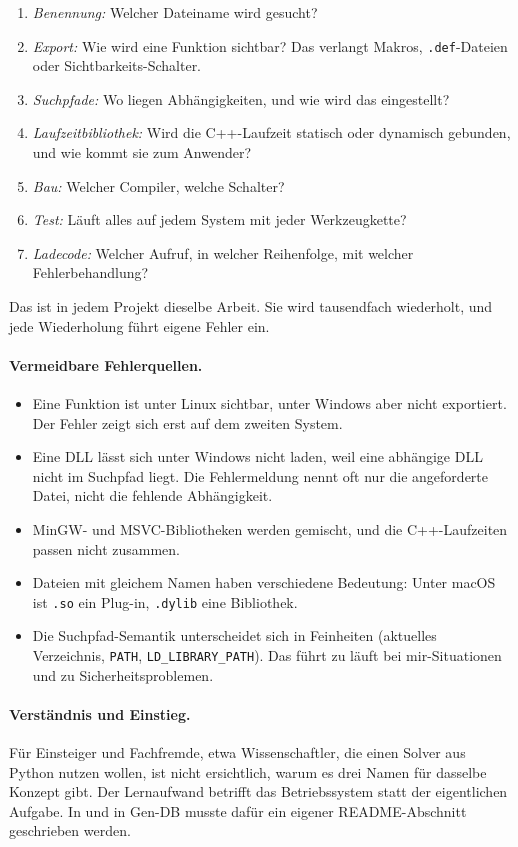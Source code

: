 \begin{enumerate}
	\item \emph{Benennung:} Welcher Dateiname wird gesucht?
	\item \emph{Export:} Wie wird eine Funktion sichtbar? Das verlangt Makros, \texttt{.def}-Dateien oder Sichtbarkeits-Schalter.
	\item \emph{Suchpfade:} Wo liegen Abhängigkeiten, und wie wird das eingestellt?
	\item \emph{Laufzeitbibliothek:} Wird die C++-Laufzeit statisch oder dynamisch gebunden, und wie kommt sie zum Anwender?
	\item \emph{Bau:} Welcher Compiler, welche Schalter?
	\item \emph{Test:} Läuft alles auf jedem System mit jeder Werkzeugkette?
	\item \emph{Ladecode:} Welcher Aufruf, in welcher Reihenfolge, mit welcher Fehlerbehandlung?
\end{enumerate}

Das ist in jedem Projekt dieselbe Arbeit. Sie wird tausendfach wiederholt, und jede Wiederholung führt eigene Fehler ein.

\paragraph{Vermeidbare Fehlerquellen.}

\begin{itemize}
	\item Eine Funktion ist unter Linux sichtbar, unter Windows aber nicht exportiert. Der Fehler zeigt sich erst auf dem zweiten System.
	\item Eine DLL lässt sich unter Windows nicht laden, weil eine abhängige DLL nicht im Suchpfad liegt. Die Fehlermeldung nennt oft nur die angeforderte Datei, nicht die fehlende Abhängigkeit.
	\item MinGW- und MSVC-Bibliotheken werden gemischt, und die C++-Laufzeiten passen nicht zusammen.
	\item Dateien mit gleichem Namen haben verschiedene Bedeutung: Unter macOS ist \texttt{.so} ein Plug-in, \texttt{.dylib} eine Bibliothek.
	\item Die Suchpfad-Semantik unterscheidet sich in Feinheiten (aktuelles Verzeichnis, \texttt{PATH}, \texttt{LD\_LIBRARY\_PATH}). Das führt zu \glqq läuft bei mir\grqq-Situationen und zu Sicherheitsproblemen.
\end{itemize}

\paragraph{Verständnis und Einstieg.} Für Einsteiger und Fachfremde, etwa Wissenschaftler, die einen Solver aus Python nutzen wollen, ist nicht ersichtlich, warum es drei Namen für dasselbe Konzept gibt. Der Lernaufwand betrifft das Betriebssystem statt der eigentlichen Aufgabe. In  und in Gen-DB musste dafür ein eigener README-Abschnitt geschrieben werden.

